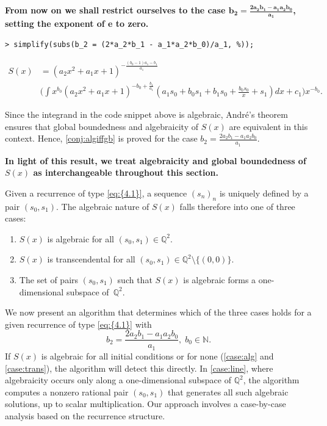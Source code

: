 \documentclass[11pt]{article}
\theoremstyle{definition}
\theoremstyle{plain}
\theoremstyle{remark}
\begin{document}
\begin{center}
\textbf{From now on we shall restrict ourselves to the case $\mathbf{b_2 = \frac{2a_2b_1-a_1a_2b_0}{a_1}}$, setting the exponent of e to zero.}
\end{center}
\begin{verbatim}
> simplify(subs(b_2 = (2*a_2*b_1 - a_1*a_2*b_0)/a_1, %));
\end{verbatim}
\begin{align*}
S(x) &= (a_2 x^2 + a_1 x + 1)^{-\frac{(b_0-1)a_1-b_1}{a_1}} \\&
\Bigg(\int x^{b_0}(a_2 x^2 + a_1 x + 1)^{-b_0+\frac{b_1}{a_1}}
\left( a_1 s_0 + b_0 s_1 + b_1 s_0 + \frac{b_0 s_0}{x} + s_1 \right)  dx 
+ c_1 \Bigg)x^{-b_0}.
\end{align*}

Since the integrand in the code snippet above is algebraic, André’s theorem ensures that global boundedness and algebraicity of $S(x)$ are equivalent in this context. Hence, \cref{conj:algiffgb} is proved for the case $b_2 = \frac{2a_2b_1-a_1a_2b_0}{a_1}$. 
\begin{center}
\textbf{In light of this result, we treat algebraicity and global boundedness of ${S(x)}$ as interchangeable throughout this section.}
\end{center}

Given a recurrence of type \eqref{eq:{4.1}}, a sequence $(s_n)_n$ is uniquely defined by a pair $(s_0,s_1)$. The algebraic nature of $S(x)$ falls therefore into one of three cases:
\begin{enumerate}[label=\textbf{(C\arabic*)}, ref=C\arabic*]
  \item \label{case:alg} $S(x)$ is algebraic for all $(s_0,s_1) \in \mathbb{Q}^2$.
  \item \label{case:trans} $S(x)$ is transcendental for all $(s_0,s_1) \in \mathbb{Q}^2 \setminus \{(0,0)\}$.
  \item \label{case:line} The set of pairs $(s_0,s_1)$ such that $S(x)$ is algebraic forms a one-dimensional subspace of~$\mathbb{Q}^2$.
\end{enumerate}
We now present an algorithm that determines which of the three cases holds for a given recurrence of type \eqref{eq:{4.1}} with 
\[b_2 = \frac{2a_2b_1-a_1a_2b_0}{a_1}, \; b_0 \in \mathbb{N}.\]
If $S(x)$ is algebraic for all initial conditions or for none (\cref{case:alg} and \cref{case:trans}), the algorithm will detect this directly. In \cref{case:line}, where algebraicity occurs only along a one-dimensional subspace of $\mathbb{Q}^2$, the algorithm computes a nonzero rational pair $(s_0,s_1)$ that generates all such algebraic solutions, up to scalar multiplication.
Our approach involves a case-by-case analysis based on the recurrence structure. 
\end{document}
